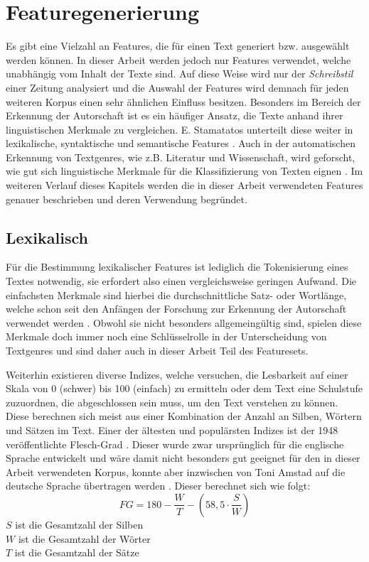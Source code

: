 \section{Featuregenerierung}\label{features}
Es gibt eine Vielzahl an Features, die für einen Text generiert bzw. ausgewählt werden können. In dieser Arbeit werden jedoch nur Features verwendet, welche unabhängig vom Inhalt der Texte sind. Auf diese Weise wird nur der \emph{Schreibstil} einer Zeitung analysiert und die Auswahl der Features wird demnach für jeden weiteren Korpus einen sehr ähnlichen Einfluss besitzen. Besonders im Bereich der Erkennung der Autorschaft ist es ein häufiger Ansatz, die Texte anhand ihrer linguistischen Merkmale zu vergleichen. E. Stamatatos unterteilt diese weiter in lexikalische, syntaktische und semantische Features \cite{stamatatos2009survey}. Auch in der automatischen Erkennung von Textgenres, wie z.B. Literatur und Wissenschaft, wird geforscht, wie gut sich linguistische Merkmale für die Klassifizierung von Texten eignen \cite{cimino2017identifying}. Im weiteren Verlauf dieses Kapitels werden die in dieser Arbeit verwendeten Features genauer beschrieben und deren Verwendung begründet.

\subsection{Lexikalisch}
Für die Bestimmung lexikalischer Features ist lediglich die Tokenisierung eines Textes notwendig, sie erfordert also einen vergleichsweise geringen Aufwand. Die einfachsten Merkmale sind hierbei die durchschnittliche Satz- oder Wortlänge, welche schon seit den Anfängen der Forschung zur Erkennung der Autorschaft verwendet werden \cite[S.~473]{stamatatos2000automatic}. Obwohl sie nicht besonders allgemeingültig sind, spielen diese Merkmale doch immer noch eine Schlüsselrolle in der Unterscheidung von Textgenres \cite{cimino2017identifying} und sind daher auch in dieser Arbeit Teil des Featuresets.

Weiterhin existieren diverse Indizes, welche versuchen, die Lesbarkeit auf einer Skala von 0 (schwer) bis 100 (einfach) zu ermitteln oder dem Text eine Schulstufe zuzuordnen, die abgeschlossen sein muss, um den Text verstehen zu können. Diese berechnen sich meist aus einer Kombination der Anzahl an Silben, Wörtern und Sätzen im Text. Einer der ältesten und populärsten Indizes ist der 1948 veröffentlichte Flesch-Grad \cite{mccallum1982computer}. Dieser wurde zwar ursprünglich für die englische Sprache entwickelt und wäre damit nicht besonders gut geeignet für den in dieser Arbeit verwendeten Korpus, konnte aber inzwischen von Toni Amstad auf die deutsche Sprache übertragen werden \cite[K.~9]{rottensteiner2010structure}. Dieser berechnet sich wie folgt:
\[ FG = 180 - \frac{W}{T} - (58,5 \cdot \frac{S}{W}) \]
$ S $ ist die Gesamtzahl der Silben\\
$ W $ ist die Gesamtzahl der Wörter\\
$ T $ ist die Gesamtzahl der Sätze

